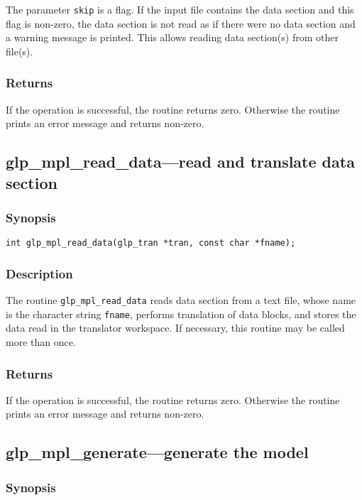 The parameter \verb|skip| is a flag. If the input file contains the
data section and this flag is non-zero, the data section is not read as
if there were no data section and a warning message is printed. This
allows reading data section(s) from other file(s).

\subsubsection*{Returns}

If the operation is successful, the routine returns zero. Otherwise
the routine prints an error message and returns non-zero.

\subsection{glp\_mpl\_read\_data---read and translate data section}

\subsubsection*{Synopsis}

\begin{verbatim}
int glp_mpl_read_data(glp_tran *tran, const char *fname);
\end{verbatim}

\subsubsection*{Description}

The routine \verb|glp_mpl_read_data| reads data section from a text
file, whose name is the character string \verb|fname|, performs
translation of data blocks, and stores the data read in the translator
workspace. If necessary, this routine may be called more than once.

\subsubsection*{Returns}

If the operation is successful, the routine returns zero. Otherwise
the routine prints an error message and returns non-zero.

\subsection{glp\_mpl\_generate---generate the model}

\subsubsection*{Synopsis}

